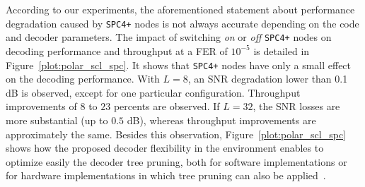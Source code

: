 According to our experiments, the aforementioned statement about performance
degradation caused by \verb|SPC4+| nodes is not always accurate depending on the
code and decoder parameters. The impact of switching \textit{on} or \textit{off}
\verb|SPC4+| nodes on decoding performance and throughput at a FER of $10^{-5}$
is detailed in Figure~\ref{plot:polar_scl_spc}. It shows that \verb|SPC4+| nodes
have only a small effect on the decoding performance. With $L=8$, an SNR
degradation lower than 0.1 dB is observed, except for one particular
configuration. Throughput improvements of $8$ to $23$ percents are observed. If
$L=32$, the SNR losses are more substantial (up to $0.5$ dB), whereas throughput
improvements are approximately the same. Besides this observation,
Figure~\ref{plot:polar_scl_spc} shows how the proposed decoder flexibility in
the \AFFECT environment enables to optimize easily the decoder tree pruning,
both for software implementations or for hardware implementations in which tree
pruning can also be applied~\cite{Lin2014}.




